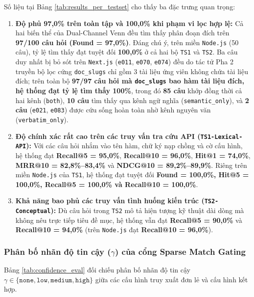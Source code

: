 Số liệu tại Bảng \ref{tab:results_per_testset} cho thấy ba đặc trưng quan trọng:
\begin{enumerate}
    \item \textbf{Độ phủ 97,0\% trên toàn tập và 100,0\% khi phạm vi lọc hợp lệ:} Cả hai biến thể của Dual-Channel Venn đều tìm thấy phân đoạn đích trên \textbf{97/100 câu hỏi (Found = 97,0\%)}. Đáng chú ý, trên miền \texttt{Node.js} (50 câu), tỷ lệ tìm thấy đạt tuyệt đối \textbf{100,0\%} ở cả hai bộ \texttt{TS1} và \texttt{TS2}. Ba câu duy nhất bị bỏ sót trên \texttt{Next.js} (\texttt{e011}, \texttt{e070}, \texttt{e074}) đều do tác tử Pha 2 truyền bộ lọc cứng \texttt{doc\_slugs} chỉ gồm 3 tài liệu ứng viên không chứa tài liệu đích; trên toàn bộ \textbf{97/97 câu hỏi mà \texttt{doc\_slugs} bao hàm tài liệu đích, hệ thống đạt tỷ lệ tìm thấy 100\%}, trong đó \textbf{85 câu} khớp đồng thời cả hai kênh (\texttt{both}), \textbf{10 câu} tìm thấy qua kênh ngữ nghĩa (\texttt{semantic\_only}), và \textbf{2 câu} (\texttt{e021}, \texttt{e083}) được cứu sống hoàn toàn nhờ kênh nguyên văn (\texttt{verbatim\_only}).
    \item \textbf{Độ chính xác rất cao trên các truy vấn tra cứu API (\texttt{TS1-Lexical-API}):} Với các câu hỏi nhắm vào tên hàm, chữ ký nạp chồng và cờ cấu hình, hệ thống đạt \textbf{Recall@5 = 95,0\%}, \textbf{Recall@10 = 96,0\%}, \textbf{Hit@1 = 74,0\%}, \textbf{MRR@10 = 82,8\%--83,4\%} và \textbf{NDCG@10 = 89,2\%--89,9\%}. Riêng trên miền \texttt{Node.js} của \texttt{TS1}, hệ thống đạt tuyệt đối \textbf{Found = 100,0\%, Hit@5 = 100,0\%, Recall@5 = 100,0\% và Recall@10 = 100,0\%}.
    \item \textbf{Khả năng bao phủ các truy vấn tình huống kiến trúc (\texttt{TS2-Conceptual}):} Dù câu hỏi trong \texttt{TS2} mô tả hiện tượng kỹ thuật dài dòng mà không nêu trực tiếp tiêu đề mục, hệ thống vẫn đạt \textbf{Recall@5 = 90,0\%} và \textbf{Recall@10 = 94,0\%} (trên \texttt{Node.js} đạt \textbf{Recall@10 = 96,0\%}).
\end{enumerate}

\subsubsection{Phân bố nhãn độ tin cậy (\texorpdfstring{$\gamma$}{gamma}) của cổng Sparse Match Gating}
Bảng \ref{tab:confidence_eval} đối chiếu phân bố nhãn độ tin cậy $\gamma \in \{\texttt{none}, \texttt{low}, \texttt{medium}, \texttt{high}\}$ giữa các cấu hình truy xuất đơn lẻ và cấu hình kết hợp.

